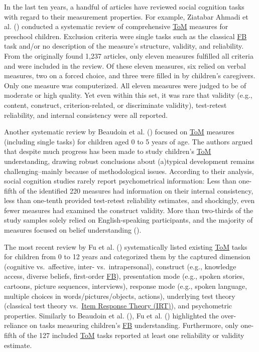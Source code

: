 \documentclass[
]{scrbook}
\begin{document}
In the last ten years, a handful of articles have reviewed social cognition tasks with regard to their measurement properties. For example, Ziatabar Ahmadi et al. () conducted a systematic review of comprehensive \hyperref[acronyms_ToM]{ToM} measures for preschool children. Exclusion criteria were single tasks such as the classical \hyperref[acronyms_FB]{FB} task and/or no description of the measure's structure, validity, and reliability. From the originally found 1,237 articles, only eleven measures fulfilled all criteria and were included in the review. Of these eleven measures, six relied on verbal measures, two on a forced choice, and three were filled in by children's caregivers. Only one measure was computerized. All eleven measures were judged to be of moderate or high quality. Yet even within this set, it was rare that validity (e.g., content, construct, criterion-related, or discriminate validity), test-retest reliability, and internal consistency were all reported.

Another systematic review by Beaudoin et al. () focused on \hyperref[acronyms_ToM]{ToM} measures (including single tasks) for children aged 0 to 5 years of age. The authors argued that despite much progress has been made to study children's \hyperref[acronyms_ToM]{ToM} understanding, drawing robust conclusions about (a)typical development remains challenging\thinspace --\thinspace mainly because of methodological issues. According to their analysis, social cognition studies rarely report psychometrical information: Less than one-fifth of the identified 220 measures had information on their internal consistency, less than one-tenth provided test-retest reliability estimates, and shockingly, even fewer measures had examined the construct validity. More than two-thirds of the study samples solely relied on English-speaking participants, and the majority of measures focused on belief understanding ().

The most recent review by Fu et al. () systematically listed existing \hyperref[acronyms_ToM]{ToM} tasks for children from 0 to 12 years and categorized them by the captured dimension (cognitive vs.~affective, inter- vs.~intrapersonal), construct (e.g., knowledge access, diverse beliefs, first-order \hyperref[acronyms_FB]{FB}), presentation mode (e.g., spoken stories, cartoons, picture sequences, interviews), response mode (e.g., spoken language, multiple choices in words/pictures/objects, actions), underlying test theory (classical test theory vs.~\hyperref[acronyms_IRT]{Item Response Theory (IRT)}), and psychometric properties. Similarly to Beaudoin et al. (), Fu et al. () highlighted the over-reliance on tasks measuring children's \hyperref[acronyms_FB]{FB} understanding. Furthermore, only one-fifth of the 127 included \hyperref[acronyms_ToM]{ToM} tasks reported at least one reliability or validity estimate.
\end{document}
